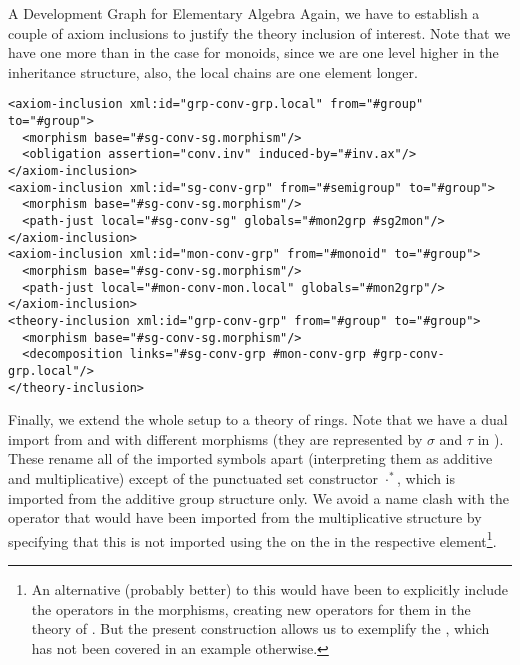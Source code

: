 \begin{tchapter}[id=dg-elal]{A Development Graph for Elementary Algebra}
Again, we have to establish a couple of axiom inclusions to justify the theory
inclusion of interest. Note that we have one more than in the case for monoids,
since we are one level higher in the inheritance structure, also, the local chains
are one element longer.
\begin{lstlisting}[mathescape,index={axiom-inclusion,theory-inclusion}]
<axiom-inclusion xml:id="grp-conv-grp.local" from="#group" to="#group">
  <morphism base="#sg-conv-sg.morphism"/>
  <obligation assertion="conv.inv" induced-by="#inv.ax"/>
</axiom-inclusion>
<axiom-inclusion xml:id="sg-conv-grp" from="#semigroup" to="#group">
  <morphism base="#sg-conv-sg.morphism"/>
  <path-just local="#sg-conv-sg" globals="#mon2grp #sg2mon"/>
</axiom-inclusion>
<axiom-inclusion xml:id="mon-conv-grp" from="#monoid" to="#group">
  <morphism base="#sg-conv-sg.morphism"/>
  <path-just local="#mon-conv-mon.local" globals="#mon2grp"/>
</axiom-inclusion>
<theory-inclusion xml:id="grp-conv-grp" from="#group" to="#group">
  <morphism base="#sg-conv-sg.morphism"/>
  <decomposition links="#sg-conv-grp #mon-conv-grp #grp-conv-grp.local"/>
</theory-inclusion>
\end{lstlisting}
Finally, we extend the whole setup to a theory of rings. Note that we have a dual import
from {} and {} with different morphisms (they are
represented by $\sigma$ and $\tau$ in {}). These rename all of the
imported symbols apart (interpreting them as additive and multiplicative) except of the
punctuated set constructor $\cdot^*$, which is imported from the additive group structure
only. We avoid a name clash with the operator that would have been imported from the
multiplicative structure by specifying that this is not imported using the
{} on the {} in the respective
{} element\footnote{An alternative (probably better) to this would have
  been to explicitly include the operators in the morphisms, creating new operators for
  them in the theory of {}.  But the present construction allows us to
  exemplify the {}, which has not been covered in an example
  otherwise.}.


\end{tchapter}
